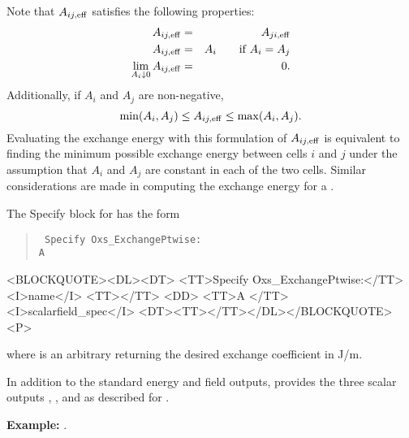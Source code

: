 \begin{itemize}
\begin{description}
   Note that $A_{ij,{\rm eff}}$ satisfies
   the following properties:
   \begin{eqnarray*}
        A_{ij,{\rm eff}} & = & A_{ji,{\rm eff}} \\
        A_{ij,{\rm eff}} & = & A_i \qquad \mbox{if $A_i=A_j$} \\
        \lim_{A_i\downarrow 0} A_{ij,{\rm eff}} & = & 0.
   \end{eqnarray*}
   Additionally, if $A_i$ and $A_j$ are non-negative,
   \begin{displaymath}
        \min(A_i,A_j) \leq  A_{ij,{\rm eff}}  \leq \max(A_i,A_j).
   \end{displaymath}
   Evaluating the exchange energy with this formulation of $A_{ij,{\rm
   eff}}$ is equivalent to finding the minimum possible exchange energy
   between cells $i$ and $j$ under the assumption that $A_i$ and $A_j$
   are constant in each of the two cells.  Similar considerations are
   made in computing the exchange energy for a  \cite{porter01}.

   The Specify block for  has the form
   \begin{latexonly}
      \begin{quote}\tt
      Specify Oxs\_ExchangePtwise: \ocb\\
        \bi A \\
      \ccb
      \end{quote}
   \end{latexonly}
   \begin{rawhtml}<BLOCKQUOTE><DL><DT>
   <TT>Specify Oxs_ExchangePtwise:</TT><I>name</I> <TT>{</TT>
       <DD> <TT>A </TT><I>scalarfield_spec</I>
   <DT><TT>}</TT></DL></BLOCKQUOTE><P>
   \end{rawhtml}
   where  is an arbitrary
    returning the desired exchange
   coefficient in J/m.

   In addition to the standard energy and field outputs,
    provides the three scalar outputs
   , , and
    as described for .

   \textbf{Example:} .


\end{description}
\end{itemize}
